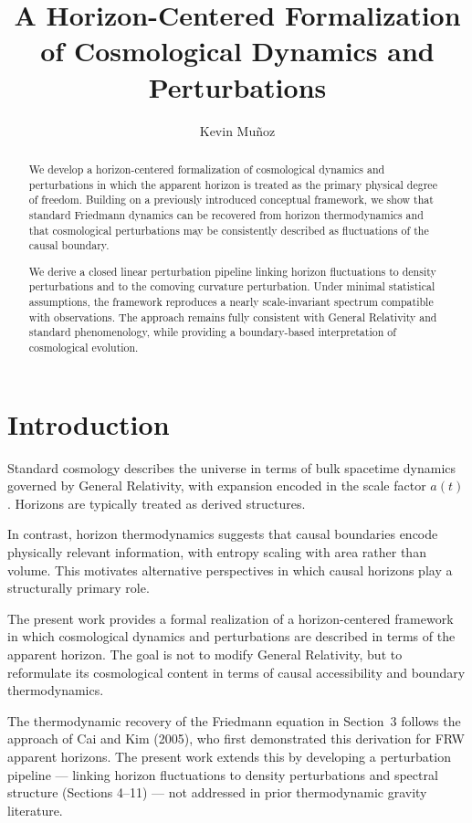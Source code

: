 \documentclass[12pt,a4paper]{article}
\title{A Horizon-Centered Formalization of Cosmological Dynamics and Perturbations}
\author{Kevin Mu\~noz}
\date{}
\begin{document}
\maketitle

\begin{abstract}
We develop a horizon-centered formalization of cosmological dynamics and perturbations in which the apparent horizon is treated as the primary physical degree of freedom. Building on a previously introduced conceptual framework, we show that standard Friedmann dynamics can be recovered from horizon thermodynamics and that cosmological perturbations may be consistently described as fluctuations of the causal boundary.

We derive a closed linear perturbation pipeline linking horizon fluctuations to density perturbations and to the comoving curvature perturbation. Under minimal statistical assumptions, the framework reproduces a nearly scale-invariant spectrum compatible with observations. The approach remains fully consistent with General Relativity and standard phenomenology, while providing a boundary-based interpretation of cosmological evolution.
\end{abstract}

\section{Introduction}

Standard cosmology describes the universe in terms of bulk spacetime dynamics governed by General Relativity, with expansion encoded in the scale factor $a(t)$. Horizons are typically treated as derived structures.

In contrast, horizon thermodynamics suggests that causal boundaries encode physically relevant information, with entropy scaling with area rather than volume. This motivates alternative perspectives in which causal horizons play a structurally primary role.

The present work provides a formal realization of a horizon-centered framework in which cosmological dynamics and perturbations are described in terms of the apparent horizon. The goal is not to modify General Relativity, but to reformulate its cosmological content in terms of causal accessibility and boundary thermodynamics.

The thermodynamic recovery of the Friedmann equation in Section~3 follows the approach of Cai and Kim (2005), who first demonstrated this derivation for FRW apparent horizons. The present work extends this by developing a perturbation pipeline --- linking horizon fluctuations to density perturbations and spectral structure (Sections 4--11) --- not addressed in prior thermodynamic gravity literature.
\end{document}
